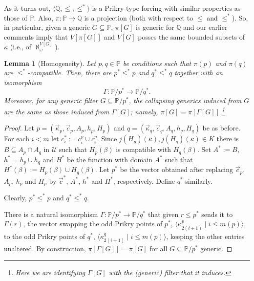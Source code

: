 \documentclass[11pt]{amsart}
\newtheorem{lemma}[theorem]{Lemma}
\theoremstyle{definition}
\theoremstyle{remark}
\def\s{\subseteq}
\begin{document}
\smallskip

 As it turns out, $\langle \mathbb{Q},\leq,\leq^*\rangle$ is  a Prikry-type forcing with similar properties as those of  $\mathbb{P}$. Also, $\pi\colon \mathbb{P}\to \mathbb{Q}$ is a projection (both with respect to $\leq$ and $\leq^*$).  So, in particular, given a generic $G\s \mathbb{P}$,  $\pi[G]$ is generic for  $\mathbb{Q}$ and our earlier comments imply that $V[\pi[G]]$ and $V[G]$ posses the same bounded subsets of $\kappa$ (i.e., of $\aleph_\omega^{V[G]}$).
\begin{lemma}[Homogeneity]
\label{lemma: homogeneity}
  Let $p, q\in \mathbb{P}$ be conditions such that $\pi(p)$ and $\pi(q)$ are $\leq^*$-compatible. Then, there are $p^*\leq^* p$ and $q^*\leq^*q$ together with an isomorphism $$\Gamma\colon \mathbb{P}/p^*\rightarrow \mathbb{P}/q^*.$$
  Moreover, for any generic filter $G\s \mathbb{P}/p^*$, the collapsing generics induced from $G$ are the same as those induced from $\Gamma[G]$; namely, $\pi[G]=\pi[\Gamma[G]]$.\footnote{Here we are identifying $\Gamma[G]$ with the (generic) filter that it induces. } 
\end{lemma}
\begin{proof}
Let $p= (\vec{\kappa}_p,\vec{c}_p, A_p, h_p, H_p)$ and $q=(\vec{\kappa}_q,\vec{c}_q, A_q, h_q, H_q)$ be as before. For each $i<m$ let $c^*_i:=c^p_i\cup c^p_i$. Since $j(H_p)(\kappa),j(H_q)(\kappa)\in K$ there is $B\s A_p\cap A_q$ in $\mathcal{U}$ such that $H_p(\beta)$ is compatible with $H_q(\beta)$. Set $A^*:=B$, $h^*=h_p\cup h_q$ and $H^*$ be the function with domain $A^*$ such that $H^*(\beta):=H_p(\beta)\cup H_q(\beta)$. Let $p^*$ be the vector obtained after replacing $\vec{c}_p$, $A_p$, $h_p$ and $H_p$ by $\vec{c}^*$, $A^*$, $h^*$ and $H^*$, respectively. Define $q^*$ similarly.

Clearly, $p^*\leq^* p$ and $q^*\leq^* q$.

There is a natural isomorphism $\Gamma\colon \mathbb{P}/p^*\to \mathbb{P}/q^*$ that given $r\leq p^*$ sends it to $\Gamma(r)$, the vector swapping the odd Prikry points of $p^*$, $\langle \kappa^{p}_{2(i+1)}\mid i\leq m(p)\rangle$, to the odd Prikry points of $q^*$, $\langle \kappa^q_{2(i+1)}\mid i\leq m(p)\rangle$, keeping the other entries unaltered. By construction,  $\pi[\Gamma[G]]=\pi[G]$ for all $G\s \mathbb{P}/p^*$ generic.
\end{proof}




\end{document}
